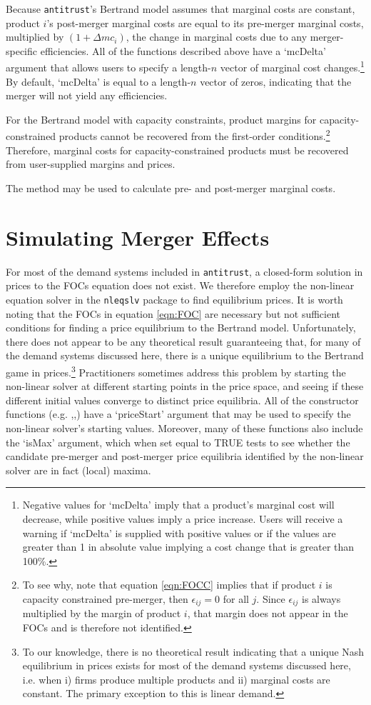 \documentclass[11pt,numbers=noenddot,pointlessnumbers]{scrreprt}
\newcommand{\atr}{{\tt antitrust}}
\newcommand{\nleqslv}{{\tt nleqslv}}
\numberwithin{equation}{section}
\begin{document}
Because \atr{}'s Bertrand model
assumes that marginal costs are constant, product $i$'s post-merger
marginal costs are equal to its pre-merger marginal costs, multiplied
by $(1+\Delta mc_i)$, the change in marginal costs due to
any merger-specific efficiencies. All of the functions described above
have a `mcDelta' argument that allows users to specify a length-$n$
vector of marginal cost changes.\footnote{Negative values for `mcDelta' imply that
a product's marginal cost will decrease, while positive values imply a
price increase. Users will receive a warning if `mcDelta' is
supplied with positive values or if the values are greater than 1 in
absolute value implying a cost change that is greater than 100\%.} By
default, `mcDelta' is equal to a length-$n$ vector of zeros,
indicating that the merger will not yield any efficiencies.

For the Bertrand model with capacity constraints, product margins for
capacity-constrained products cannot be recovered from the first-order
conditions.\footnote{To see why, note that equation
\ref{eqn:FOCC} implies that if product $i$ is capacity constrained
pre-merger, then $\epsilon_{ij}=0$ for all $j$. Since $\epsilon_{ij}$
is always multiplied by the margin of product $i$, that margin does
not appear in the FOCs and is therefore not identified.} Therefore,
marginal costs for capacity-constrained products must be recovered
from user-supplied margins and prices.


The \verb@calcMC@ method may be used to calculate pre- and post-merger
marginal costs.

\section{Simulating Merger Effects}
For most of the demand systems included in \atr{}, a closed-form
solution in prices to the FOCs equation does not exist. We therefore employ
the non-linear equation solver in the \nleqslv{} package to find
equilibrium prices. It is worth noting that the FOCs in equation \ref{eqn:FOC}
are necessary but not sufficient conditions for finding a price equilibrium to the Bertrand
model. Unfortunately, there does not appear to be any theoretical
result guaranteeing that, for many of the demand systems discussed here,
there is a unique equilibrium to the Bertrand game in
prices.\footnote{To our knowledge, there is no theoretical result
  indicating that a unique Nash equilibrium in prices exists for most
  of the demand systems discussed here, i.e. when i) firms produce multiple
  products and ii) marginal costs are constant. The primary exception
  to this is linear demand.} Practitioners sometimes
address this problem by starting the non-linear solver at different
starting points in the price space, and seeing if these different
initial values converge to distinct price equilibria. All of the
constructor functions (e.g. \verb@linear@,\verb@loglinear@,\verb@logit@) have a `priceStart'
argument that may be used to specify the non-linear solver's starting
values. Moreover, many of these functions also include the
`isMax' argument, which when set equal to TRUE tests to see whether the
candidate pre-merger and post-merger price equilibria identified by the
non-linear solver are in fact (local) maxima.
\end{document}
